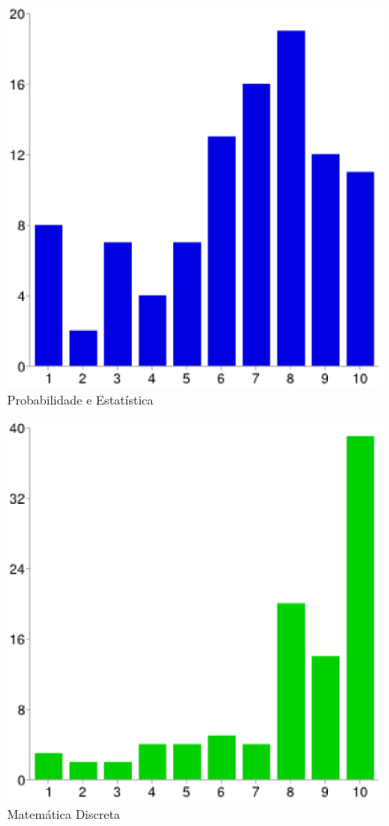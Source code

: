 \documentclass[12pt,a4paper]{article}
\begin{document}
\begin{figure}[htb]
	\center
	\includegraphics[scale=0.36]{imagens/10.eps} 
	\caption{Probabilidade e Estatística} 
	\label{fig:grafProbabilidade}
\end{figure}

\begin{figure}[htb]
	\center
	\includegraphics[scale=0.36]{imagens/11.eps}
	\caption{Matemática Discreta}
	\label{fig:grafMD}
\end{figure}
\end{document}
